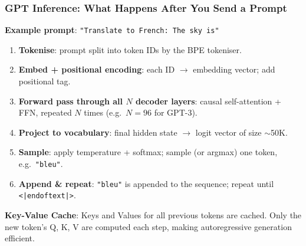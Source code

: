 \begin{frame}[fragile]\frametitle{GPT Inference: What Happens After You Send a Prompt}
\textbf{Example prompt}: \texttt{"Translate to French: The sky is"}

\begin{enumerate}
\item \textbf{Tokenise}: prompt split into token IDs by the BPE tokeniser.
\item \textbf{Embed + positional encoding}: each ID $\rightarrow$ embedding vector; add positional tag.
\item \textbf{Forward pass through all $N$ decoder layers}:
      causal self-attention + FFN, repeated $N$ times (e.g.\ $N=96$ for GPT-3).
\item \textbf{Project to vocabulary}: final hidden state $\rightarrow$ logit vector of size $\sim$50K.
\item \textbf{Sample}: apply temperature + softmax; sample (or argmax) one token, e.g.\ \texttt{"bleu"}.
\item \textbf{Append \& repeat}: \texttt{"bleu"} is appended to the sequence; repeat until \texttt{<|endoftext|>}.
\end{enumerate}
\vspace{0.3em}
\textbf{Key-Value Cache}: Keys and Values for all previous tokens are cached.  Only the new token's Q, K, V are computed each step,  making autoregressive generation efficient.
\end{frame}


